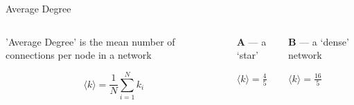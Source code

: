 \documentclass[notes, aspectratio=1610]{beamer}
\begin{document}
\begin{frame}{Average Degree}{}
	\begin{columns}
		\begin{column}{0.33\textwidth}

			'Average Degree' is the mean number of connections 
			per node in a network

			\begin{equation*}
				\langle k \rangle = \frac{1}{N}\sum_{i=1}^{N}k_{i} 
			\end{equation*}
			
		\end{column}
		\begin{column}{0.33\textwidth}
			\centering

			\textbf{A} ---  a `star'
			
			\vspace{1em}

			
			
			\vspace{1em}

			$\langle k \rangle = \frac{4}{5}$

		\end{column}
		\begin{column}{0.33\textwidth}
			\centering 
			\textbf{B} --- a `dense' network			

			\vspace{1em}

			
			
			\vspace{1em}

			$\langle k \rangle = \frac{16}{5}$
		
		\end{column}
	\end{columns}
\end{frame}
\end{document}
